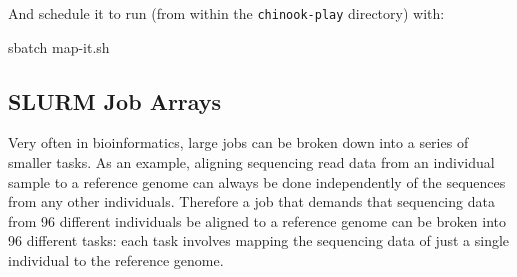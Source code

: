 \documentclass[]{krantz}
\makeatletter
\newenvironment{Shaded}{\begin{snugshade}}{\end{snugshade}}
\newcommand{\BuiltInTok}[1]{#1}
\newcommand{\CommentTok}[1]{\textcolor[rgb]{0.37,0.37,0.37}{\textit{#1}}}
\newcommand{\ExtensionTok}[1]{#1}
\newcommand{\KeywordTok}[1]{\textcolor[rgb]{0.27,0.27,0.27}{\textbf{#1}}}
\newcommand{\NormalTok}[1]{#1}
\newenvironment{kframe}{%
\medskip{}
\setlength{\fboxsep}{.8em}
 \def\at@end@of@kframe{}%
 \ifinner\ifhmode%
  \def\at@end@of@kframe{\end{minipage}}%
  \begin{minipage}{\columnwidth}%
 \fi\fi%
 \def\FrameCommand##1{\hskip\@totalleftmargin \hskip-\fboxsep
 \colorbox{shadecolor}{##1}\hskip-\fboxsep
     \hskip-\linewidth \hskip-\@totalleftmargin \hskip\columnwidth}%
 \MakeFramed {\advance\hsize-\width
   \@totalleftmargin\z@ \linewidth\hsize
   \@setminipage}}%
 {\par\unskip\endMakeFramed%
 \at@end@of@kframe}
\renewenvironment{Shaded}{\begin{kframe}}{\end{kframe}}
\makeatother
\begin{document}
\begin{Shaded}
\end{Shaded}

And schedule it to run (from within the \texttt{chinook-play} directory) with:

\begin{Shaded}
\begin{Highlighting}[]
\ExtensionTok{sbatch}\NormalTok{ map-it.sh}
\end{Highlighting}
\end{Shaded}

\hypertarget{slurm-job-arrays}{%
\subsection{SLURM Job Arrays}\label{slurm-job-arrays}}

Very often in bioinformatics, large jobs can be broken down into a series of
smaller tasks. As an example, aligning sequencing read data from an individual sample
to a reference genome
can always be done independently of the sequences from any other individuals. Therefore
a job that demands that sequencing data from 96 different individuals be aligned to
a reference genome can be broken into 96 different tasks: each task involves mapping
the sequencing data of just a single individual to the reference genome.
\end{document}
